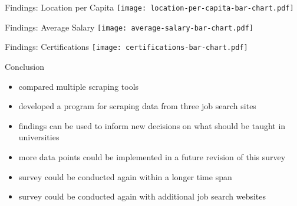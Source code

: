 \documentclass[aspectratio=169]{beamer}
\begin{document}
  \begin{frame}{Findings: Location per Capita}
    \texttt{[image: location-per-capita-bar-chart.pdf]}
  \end{frame}

  \begin{frame}{Findings: Average Salary}
    \texttt{[image: average-salary-bar-chart.pdf]}
  \end{frame}

  \begin{frame}{Findings: Certifications}
    \texttt{[image: certifications-bar-chart.pdf]}
  \end{frame}

  \begin{frame}{Conclusion}
    \begin{itemize}
      \item compared multiple scraping tools
      \item developed a program for scraping data from three job search sites
      \item findings can be used to inform new decisions on what should be taught in universities
      \item more data points could be implemented in a future revision of this survey
      \item survey could be conducted again within a longer time span
      \item survey could be conducted again with additional job search websites
    \end{itemize}
  \end{frame}
\end{document}
